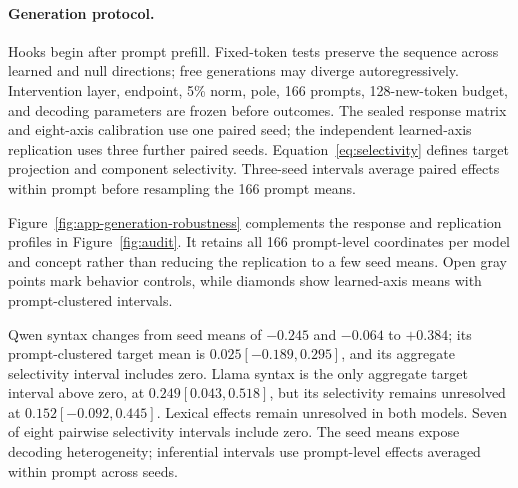\paragraph{Generation protocol.} Hooks begin after prompt prefill. Fixed-token tests preserve the sequence across learned and null directions; free generations may diverge autoregressively. Intervention layer, endpoint, 5\% norm, pole, 166 prompts, 128-new-token budget, and decoding parameters are frozen before outcomes. The sealed response matrix and eight-axis calibration use one paired seed; the independent learned-axis replication uses three further paired seeds. Equation~\ref{eq:selectivity} defines target projection and component selectivity. Three-seed intervals average paired effects within prompt before resampling the 166 prompt means.

Figure~\ref{fig:app-generation-robustness} complements the response and replication profiles in Figure~\ref{fig:audit}. It retains all 166 prompt-level coordinates per model and concept rather than reducing the replication to a few seed means. Open gray points mark behavior controls, while diamonds show learned-axis means with prompt-clustered intervals.

Qwen syntax changes from seed means of \(-0.245\) and \(-0.064\) to \(+0.384\); its prompt-clustered target mean is \(0.025[-0.189,0.295]\), and its aggregate selectivity interval includes zero. Llama syntax is the only aggregate target interval above zero, at \(0.249[0.043,0.518]\), but its selectivity remains unresolved at \(0.152[-0.092,0.445]\). Lexical effects remain unresolved in both models. Seven of eight pairwise selectivity intervals include zero. The seed means expose decoding heterogeneity; inferential intervals use prompt-level effects averaged within prompt across seeds.

